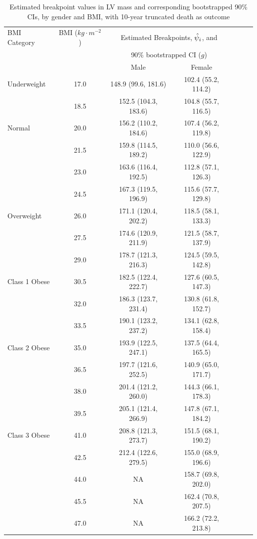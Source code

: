 \documentclass [12pt, proquest] {uwthesis}[2016/11/22]
\begin{document}
\begin{table}
\centering
\renewcommand\arraystretch{0.75}
\begin{tabular}{@{} lcccccc @{}} 
\toprule
    {BMI Category} & {BMI ($kg \cdot m^{-2}$)} & \multicolumn{2}{c}{Estimated Breakpoints, $\Hat{\psi}_i$, and} \\
    & & \multicolumn{2}{c}{90\% bootstrapped CI ($g$)} \\
    \cmidrule(lr){3-4}
     & & Male & Female \\
\midrule
    Underweight & 17.0 & 148.9 (99.6, 181.6) & 102.4 (55.2, 114.2)\\ 
    & 18.5 & 152.5 (104.3, 183.6) & 104.8 (55.7, 116.5) \\
\midrule
    Normal & 20.0 & 156.2 (110.2, 184.6) & 107.4 (56.2, 119.8) \\
    & 21.5 & 159.8 (114.5, 189.2) & 110.0 (56.6, 122.9) \\
    & 23.0 & 163.6 (116.4, 192.5) & 112.8 (57.1, 126.3) \\
    & 24.5 & 167.3 (119.5, 196.9) & 115.6 (57.7, 129.8) \\
\midrule
    Overweight & 26.0 & 171.1 (120.4, 202.2) & 118.5 (58.1, 133.3) \\
    & 27.5 & 174.6 (120.9, 211.9) & 121.5 (58.7, 137.9) \\
    & 29.0 & 178.7 (121.3, 216.3) & 124.5 (59.5, 142.8) \\
\midrule
    Class 1 Obese & 30.5 & 182.5 (122.4, 222.7) & 127.6 (60.5, 147.3) \\
    & 32.0 & 186.3 (123.7, 231.4) & 130.8 (61.8, 152.7) \\
    & 33.5 & 190.1 (123.2, 237.2) & 134.1 (62.8, 158.4) \\
\midrule
    Class 2 Obese & 35.0 & 193.9 (122.5, 247.1) & 137.5 (64.4, 165.5) \\
    & 36.5 & 197.7 (121.6, 252.5) & 140.9 (65.0, 171.7) \\
    & 38.0 & 201.4 (121.2, 260.0) & 144.3 (66.1, 178.3) \\
    & 39.5 & 205.1 (121.4, 266.9) & 147.8 (67.1, 184.2) \\
\midrule
    Class 3 Obese & 41.0 & 208.8 (121.3, 273.7) & 151.5 (68.1, 190.2) \\
    & 42.5 & 212.4 (122.6, 279.5) & 155.0 (68.9, 196.6) \\
    & 44.0 & NA & 158.7 (69.8, 202.0) \\
    & 45.5 & NA & 162.4 (70.8, 207.5) \\
    & 47.0 & NA & 166.2 (72.2, 213.8) \\
\bottomrule
\end{tabular}
\caption{Estimated breakpoint values in LV mass and corresponding bootstrapped 90\% CIs, by gender and BMI, with 10-year truncated death as outcome}
\end{table}
\end{document}

